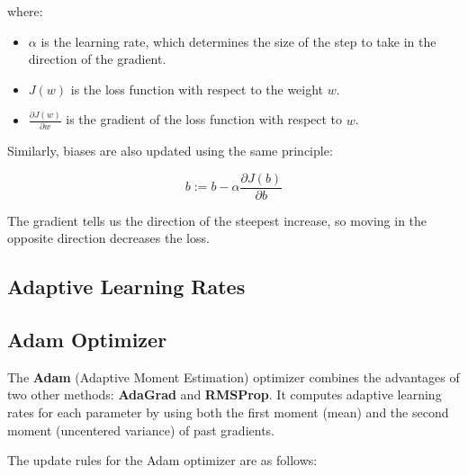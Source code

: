 \documentclass{article}
\begin{document}
where:
\begin{itemize}
    \item \( \alpha \) is the learning rate, which determines the size of the step to take in the direction of the gradient.
    \item \( J(w) \) is the loss function with respect to the weight \( w \).
    \item \( \frac{\partial J(w)}{\partial w} \) is the gradient of the loss function with respect to \( w \).
\end{itemize}

Similarly, biases are also updated using the same principle:

\[
b := b - \alpha \frac{\partial J(b)}{\partial b}
\]

The gradient tells us the direction of the steepest increase, so moving in the opposite direction decreases the loss.

\subsection{Adaptive Learning Rates}

\subsection*{Adam Optimizer}
The \textbf{Adam} (Adaptive Moment Estimation) optimizer combines the advantages of two other methods: \textbf{AdaGrad} and \textbf{RMSProp}. It computes adaptive learning rates for each parameter by using both the first moment (mean) and the second moment (uncentered variance) of past gradients.

The update rules for the Adam optimizer are as follows:
\end{document}
